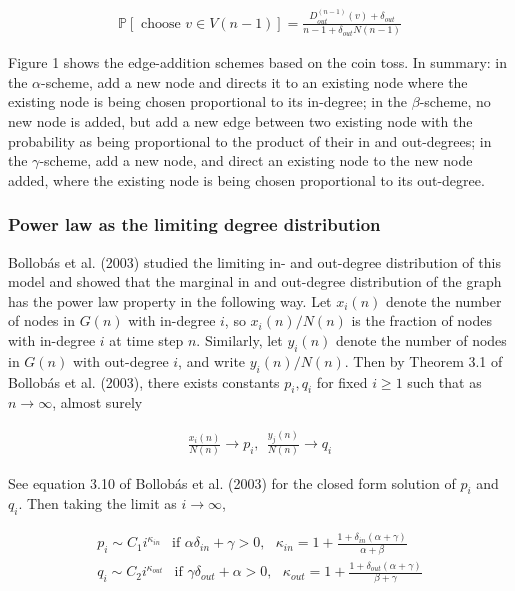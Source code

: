 \documentclass[]{elsarticle} %
\begin{document}
\begin{align}
\mathbb{P}[\text{ choose } v \in V(n-1)] = \frac{ D_{out}^{(n-1)}(v) + \delta_{out} }{n - 1 + \delta_{out}N(n-1)}
\end{align}

Figure 1 shows the edge-addition schemes based on the coin toss. In
summary: in the \(\alpha\)-scheme, add a new node and directs it to an
existing node where the existing node is being chosen proportional to
its in-degree; in the \(\beta\)-scheme, no new node is added, but add a
new edge between two existing node with the probability as being
proportional to the product of their in and out-degrees; in the
\(\gamma\)-scheme, add a new node, and direct an existing node to the
new node added, where the existing node is being chosen proportional to
its out-degree.

\subsubsection{Power law as the limiting degree
distribution}\label{power-law-as-the-limiting-degree-distribution}

Bollobás et al. (2003) studied the limiting in- and out-degree
distribution of this model and showed that the marginal in and
out-degree distribution of the graph has the power law property in the
following way. Let \(x_i(n)\) denote the number of nodes in \(G(n)\)
with in-degree \(i\), so \(x_i(n)/{N(n)}\) is the fraction of nodes with
in-degree \(i\) at time step \(n\). Similarly, let \(y_i(n)\) denote the
number of nodes in \(G(n)\) with out-degree \(i\), and write
\(y_i(n)/N(n)\). Then by Theorem 3.1 of Bollobás et al. (2003), there
exists constants \(p_i, q_i\) for fixed \(i \geq 1\) such that as
\(n \to \infty\), almost surely

\begin{align}
\frac{x_i(n)}{N(n)} \rightarrow p_i, \ \ \frac{y_j(n)}{N(n)} \rightarrow q_i
\end{align}

\noindent See equation 3.10 of Bollobás et al. (2003) for the closed
form solution of \(p_i\) and \(q_i\). Then taking the limit as
\(i \to \infty\),

\begin{align}
p_i \sim C_{1} i^{\kappa_{in}}  \ \ \text{    if } \alpha \delta_{in} + \gamma > 0, \ \ \ \kappa_{in} = 1 + \frac{1+ \delta_{in}(\alpha + \gamma)}{\alpha + \beta} \\
q_i \sim C_{2} i^{\kappa_{out}}  \ \ \text{    if } \gamma \delta_{out} + \alpha > 0, \ \ \ \kappa_{out} = 1 + \frac{1+ \delta_{out}(\alpha + \gamma)}{\beta + \gamma}
\end{align}
\end{document}
